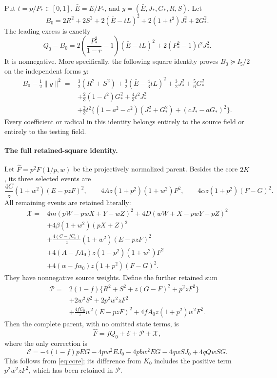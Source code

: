 \documentclass[11pt]{article}
\begin{document}
Put $t=p/P_*\in[0,1]$, $\bar E=E/P_*$, and
$y=(\bar E,J_*,G_*,R,S)$. Let
\[
 B_0=2R^2+2S^2+2(\bar E-tL)^2
                         +2(1+t^2)J_*^2+2G_*^2.
\]
The leading excess is exactly
\begin{equation}\label{eq:leadingexcess}
 Q_0-B_0=2\left(\frac{P_*^2}{1-r}-1\right)(\bar E-tL)^2
                   +2(P_*^2-1)t^2J_*^2.
\end{equation}
It is nonnegative. More specifically, the following square identity
proves $B_0\succeq I_5/2$ on the independent forms $y$:
\begin{align}\label{eq:strictbaseline}
 B_0-\tfrac12\|y\|^2={}&
 \tfrac32(R^2+S^2)+\tfrac32(\bar E-\tfrac43tL)^2
 +\tfrac32J_*^2+\tfrac56G_*^2\nonumber\\
 &+\tfrac23(1-t^2)G_*^2+\tfrac43t^2J_*^2\nonumber\\
 &+\tfrac23t^2\{(1-a^2-c^2)(J_*^2+G_*^2)
                            +(cJ_*-aG_*)^2\}.
\end{align}
Every coefficient or radical in this identity belongs entirely to
the source field or entirely to the testing field.

\paragraph{The full retained-square identity.}
Let $\widehat F=p^2F(1/p,w)$ be the projectively normalized parent.
Besides the core $2K$, its three selected events are
\[
 \frac{4C}{z}(1+w^2)(E-pzF)^2,\qquad
 4Az(1+p^2)(1+w^2)F^2,\qquad
 4\alpha z(1+p^2)(F-G)^2.
\]
All remaining events are retained literally:
\begin{align*}
 \mathcal X={}&4m(pW-pwX+Y-wZ)^2
 +4D(wW+X-pwY-pZ)^2\\
 &+4\beta(1+w^2)(pX+Z)^2\\
 &+\frac{4(C-fC_0)}z(1+w^2)(E-pzF)^2\\
 &+4(A-fA_0)z(1+p^2)(1+w^2)F^2\\
 &+4(\alpha-f\alpha_0)z(1+p^2)(F-G)^2.
\end{align*}
They have nonnegative source weights. Define the further retained sum
\begin{align*}
 \mathcal P={}&2(1-f)\{R^2+S^2+z(G-F)^2+p^2zF^2\}\\
 &+2w^2S^2+2p^2w^2zF^2\\
 &+\frac{4fC_0}z w^2(E-pzF)^2
                      +4fA_0z(1+p^2)w^2F^2.
\end{align*}
Then the complete parent, with no omitted state terms, is
\begin{equation}\label{eq:whole}
 \widehat F=fQ_0+\mathcal E+\mathcal P+\mathcal X,
\end{equation}
where the only correction is
\begin{equation}\label{eq:error}
 \mathcal E=-4(1-f)pEG-4pw^2EJ_0-4pbw^2EG
                              -4qwSJ_0+4qQwSG.
\end{equation}
This follows from \eqref{eq:core}; its difference from $K_0$ includes
the positive term $p^2w^2zF^2$, which has been retained in
$\mathcal P$.
\end{document}
